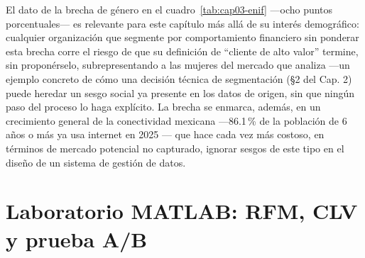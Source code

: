 El dato de la brecha de género en el cuadro~\ref{tab:cap03-enif} —ocho
puntos porcentuales— es relevante para este capítulo más allá de su interés
demográfico: cualquier organización que segmente por comportamiento
financiero sin ponderar esta brecha corre el riesgo de que su definición de
\enquote{cliente de alto valor} termine, sin proponérselo, subrepresentando a
las mujeres del mercado que analiza —un ejemplo concreto de cómo una decisión
técnica de segmentación (§2 del Cap. 2) puede heredar un sesgo social ya
presente en los datos de origen, sin que ningún paso del proceso lo haga
explícito. La brecha se enmarca, además, en un crecimiento general de la
conectividad mexicana —86.1\,\% de la población de 6 años o más ya usa
internet en 2025 \parencite{inegi2026endutih}— que hace cada vez más costoso,
en términos de mercado potencial no capturado, ignorar sesgos de este tipo
en el diseño de un sistema de gestión de datos.

\section{Laboratorio MATLAB: RFM, CLV y prueba A/B}

